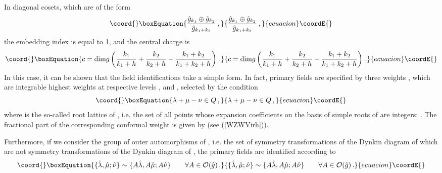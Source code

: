 \documentclass[a4paper,12pt]{report}
\begin{document}
In diagonal cosets, which are of the form
\begin{equation}\coord{}\boxEquation{
\frac{\hat{g}_{k_{1}}\oplus\hat{g}_{k_{2}}}{\hat{g}_{k_{1}+k_{2}}}\:,
}{
\frac{\hat{g}_{k_{1}}\oplus\hat{g}_{k_{2}}}{\hat{g}_{k_{1}+k_{2}}}\:,
}{ecuacion}\coordE{}\end{equation}
the embedding index is equal to 1, and the central charge is
\begin{equation}\coord{}\boxEquation{
c=\textrm{dim}g \left(\frac{k_{1}}{k_{1}+h}+\frac{k_{2}}{k_{2}+h}-\frac{k_{1}+k_{2}}{k_{1}+k_{2}+h}\right)\,.
}{
c=\textrm{dim}g \left(\frac{k_{1}}{k_{1}+h}+\frac{k_{2}}{k_{2}+h}-\frac{k_{1}+k_{2}}{k_{1}+k_{2}+h}\right)\,.
}{ecuacion}\coordE{}\end{equation}
In this case, it can be shown that the field identifications take a simple form. In fact, primary fields are
specified by three weights \myHighlight{$\{\hat{\lambda},\hat{\mu};\hat{\nu}\}$}\coordHE{}, which are integrable highest weights at
respective levels \coordHE{}, \coordHE{} and \coordHE{}, selected by the condition
\begin{equation}\coord{}\boxEquation{\label{cosetfields}
\lambda+\mu-\nu\in Q \,,
}{\lambda+\mu-\nu\in Q \,,
}{ecuacion}\coordE{}\end{equation}
where \coordHE{} is the so-called root lattice of \coordHE{}, i.e. the set of all points whose expansion coefficients on the
basis of simple roots of \coordHE{} are integers: \coordHE{}. The fractional part of the
corresponding conformal weight \coordHE{} is given by
\coordHE{} (see (\ref{WZWVirh})).

Furthermore, if we consider the group \coordHE{} of outer automorphisms of \coordHE{}, i.e. the set of
symmetry transformations of the Dynkin diagram of \coordHE{} which are not symmetry transformations of the Dynkin
diagram of \coordHE{}, the primary fields are identified according to
\begin{equation}\coord{}\boxEquation{
\{\hat{\lambda},\hat{\mu};\hat{\nu}\}\sim \{A\hat{\lambda},A\hat{\mu};A\hat{\nu}\}\qquad\forall A\in{\cal
O}(\hat{g})\,.
}{
\{\hat{\lambda},\hat{\mu};\hat{\nu}\}\sim \{A\hat{\lambda},A\hat{\mu};A\hat{\nu}\}\qquad\forall A\in{\cal
O}(\hat{g})\,.
}{ecuacion}\coordE{}\end{equation}
\end{document}
